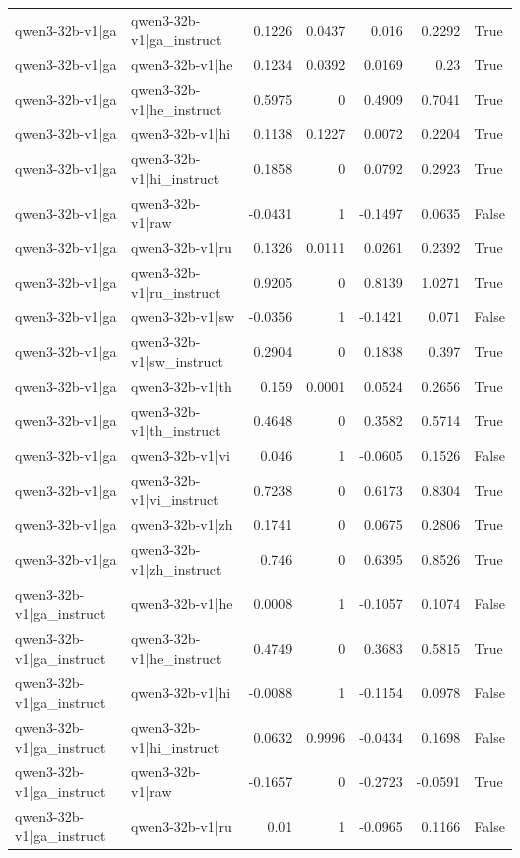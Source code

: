 \begin{table}
\begin{tabular}{l l r r r r l}
qwen3-32b-v1|ga & qwen3-32b-v1|ga_instruct & 0.1226 & 0.0437 & 0.016 & 0.2292 & True \\
qwen3-32b-v1|ga & qwen3-32b-v1|he & 0.1234 & 0.0392 & 0.0169 & 0.23 & True \\
qwen3-32b-v1|ga & qwen3-32b-v1|he_instruct & 0.5975 & 0 & 0.4909 & 0.7041 & True \\
qwen3-32b-v1|ga & qwen3-32b-v1|hi & 0.1138 & 0.1227 & 0.0072 & 0.2204 & True \\
qwen3-32b-v1|ga & qwen3-32b-v1|hi_instruct & 0.1858 & 0 & 0.0792 & 0.2923 & True \\
qwen3-32b-v1|ga & qwen3-32b-v1|raw & -0.0431 & 1 & -0.1497 & 0.0635 & False \\
qwen3-32b-v1|ga & qwen3-32b-v1|ru & 0.1326 & 0.0111 & 0.0261 & 0.2392 & True \\
qwen3-32b-v1|ga & qwen3-32b-v1|ru_instruct & 0.9205 & 0 & 0.8139 & 1.0271 & True \\
qwen3-32b-v1|ga & qwen3-32b-v1|sw & -0.0356 & 1 & -0.1421 & 0.071 & False \\
qwen3-32b-v1|ga & qwen3-32b-v1|sw_instruct & 0.2904 & 0 & 0.1838 & 0.397 & True \\
qwen3-32b-v1|ga & qwen3-32b-v1|th & 0.159 & 0.0001 & 0.0524 & 0.2656 & True \\
qwen3-32b-v1|ga & qwen3-32b-v1|th_instruct & 0.4648 & 0 & 0.3582 & 0.5714 & True \\
qwen3-32b-v1|ga & qwen3-32b-v1|vi & 0.046 & 1 & -0.0605 & 0.1526 & False \\
qwen3-32b-v1|ga & qwen3-32b-v1|vi_instruct & 0.7238 & 0 & 0.6173 & 0.8304 & True \\
qwen3-32b-v1|ga & qwen3-32b-v1|zh & 0.1741 & 0 & 0.0675 & 0.2806 & True \\
qwen3-32b-v1|ga & qwen3-32b-v1|zh_instruct & 0.746 & 0 & 0.6395 & 0.8526 & True \\
qwen3-32b-v1|ga_instruct & qwen3-32b-v1|he & 0.0008 & 1 & -0.1057 & 0.1074 & False \\
qwen3-32b-v1|ga_instruct & qwen3-32b-v1|he_instruct & 0.4749 & 0 & 0.3683 & 0.5815 & True \\
qwen3-32b-v1|ga_instruct & qwen3-32b-v1|hi & -0.0088 & 1 & -0.1154 & 0.0978 & False \\
qwen3-32b-v1|ga_instruct & qwen3-32b-v1|hi_instruct & 0.0632 & 0.9996 & -0.0434 & 0.1698 & False \\
qwen3-32b-v1|ga_instruct & qwen3-32b-v1|raw & -0.1657 & 0 & -0.2723 & -0.0591 & True \\
qwen3-32b-v1|ga_instruct & qwen3-32b-v1|ru & 0.01 & 1 & -0.0965 & 0.1166 & False \\

\end{tabular}
\end{table}
